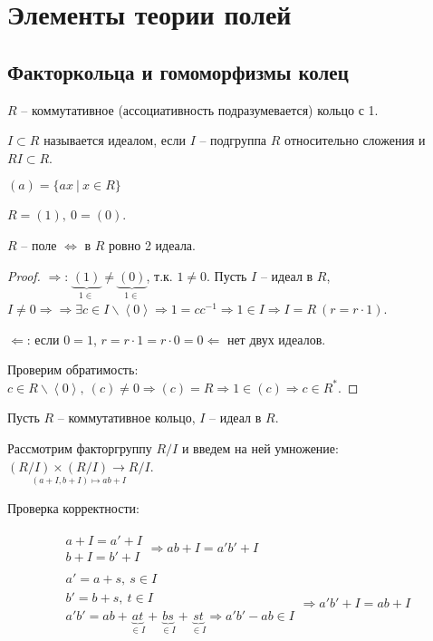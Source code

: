 \documentclass[main]{subfiles}
\begin{document}
\part{ Элементы теории полей}

\chapter{Факторкольца и гомоморфизмы колец}

$R$ -- коммутативное (ассоциативность подразумевается) кольцо с 1. 

$I \subset R$ называется идеалом, если $I$ -- подгруппа $R$ относительно сложения и $RI \subset R$.

$(a) = \{ax \ |\ x \in R\}$

$R = (1), \ 0 = (0)$.

\begin{proposition}
    $R$ -- поле $\Leftrightarrow$ в $R$ ровно 2 идеала.
\end{proposition}

\begin{proof}
    $\Rightarrow$: $\underbrace{(1)}_{1 \in} \neq \underbrace{(0)}_{1 \in}$, т.к. $1 \neq 0$.
    Пусть $I$ -- идеал в $R$, $I \neq 0 \Rightarrow \Rightarrow \exists c \in I \backslash \left\langle 0\right\rangle
    \Rightarrow 1 = c c^{-1} \Rightarrow 1 \in I \Rightarrow I = R \ (r = r \cdot 1) $.

    $\Leftarrow$: если $0 = 1$, $r = r \cdot 1 = r \cdot 0 = 0 \Leftarrow$ нет двух идеалов.
    
    Проверим обратимость: $c \in R \backslash \left\langle 0\right\rangle, \ (c) \neq 0 \Rightarrow
    (c) = R \Rightarrow 1 \in (c) \Rightarrow c \in R^*$. 
\end{proof}

Пусть $R$ -- коммутативное кольцо, $I$ -- идеал в $R$.

Рассмотрим факторгруппу $R/I$ и введем на ней умножение: \\ $\underset{(a+I, b+I) \mapsto ab+I}{(R/I)\times(R/I) \rightarrow R/I}$.

Проверка корректности:

\begin{gather*}
    \begin{gathered}
        a + I = a' + I \\
        b + I = b' + I 
    \end{gathered} \Rightarrow ab +I = a'b' +I \\
    \begin{gathered}
        a'= a + s, \ s\in I \\
        b'= b + s, \ t\in I \\
        a'b' = ab + \underbrace{at}_{\in I} + \underbrace{bs}_{\in I} + \underbrace{st}_{\in I}  \Rightarrow a'b' - ab \in I
    \end{gathered} \Rightarrow a'b' + I = ab +I
\end{gather*}
\end{document}
